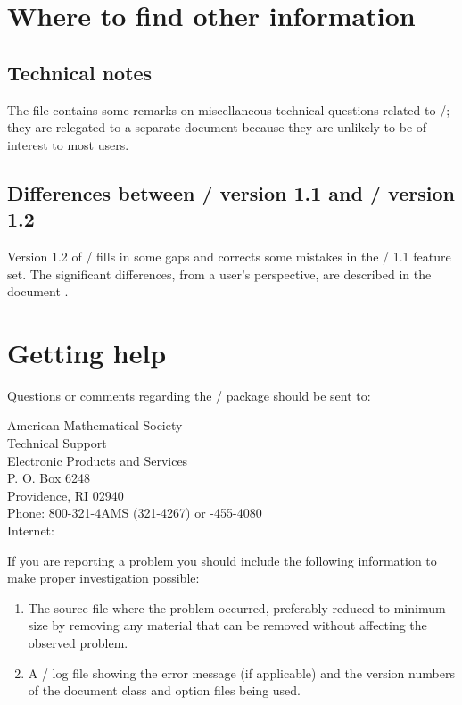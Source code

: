 \documentclass[leqno,titlepage,openany]{amsldoc}
\newenvironment{infoaddress}{%
  \par\topsep\medskipamount
  \trivlist\centering
  \item[]%
  \begin{minipage}{.7\columnwidth}%
  \raggedright
}{%
  \end{minipage}%
  \endtrivlist
}
\begin{document}

\chapter{Where to find other information}

\section{Technical notes}
The file  contains some remarks on miscellaneous
technical questions related to \amslatex/; they are relegated to a
separate document because they are unlikely to be of interest to most
users.

\section{Differences between \amslatex/ version 1.1 and \amslatex/
version 1.2}

Version 1.2 of \amslatex/ fills in some gaps and corrects some mistakes
in the \amslatex/ 1.1 feature set. The significant differences, from a
user's perspective, are described in the document .


\chapter{Getting help}\label{help}

Questions or comments regarding the \amslatex/ package should be sent
to:
\begin{infoaddress}
American Mathematical Society\\
Technical Support\\
Electronic Products and Services\\
P. O. Box 6248\\
Providence, RI 02940\\[3pt]
Phone: 800-321-4AMS (321-4267) \quad or -455-4080\\
Internet: 
\end{infoaddress}
If you are reporting a problem you should include
the following information to make proper investigation possible:
\begin{enumerate}
\item The source file where the problem occurred, preferably reduced
  to minimum size by removing any material that can be removed without
  affecting the observed problem.
\item A \latex/ log file showing the error message (if applicable) and
  the version numbers of the document class and option files being used.
\end{enumerate}
\end{document}
